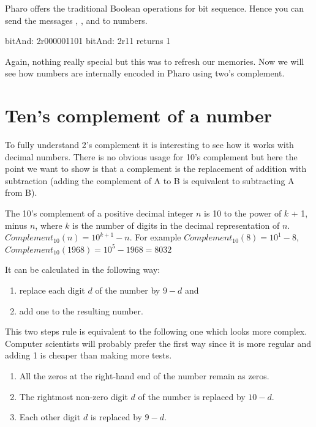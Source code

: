 \documentclass[a4paper,10pt,twoside]{book}
\begin{document}


Pharo offers the traditional Boolean operations for bit sequence. Hence you can send the messages , , and  to numbers. 

\begin{code}{bitAnd:}
2r000001101 bitAnd: 2r11
	returns 1 
\end{code}

Again, nothing really special but this was to refresh our memories. Now we will see how numbers are internally encoded in Pharo using two's complement. 

\section{Ten's complement of a number}

To fully understand 2's complement it is interesting to see how it works with decimal numbers. There is no obvious usage for 10's complement but here the point we want to show is that a complement is the replacement of addition with subtraction (\ie adding the complement of A to B is equivalent to subtracting A from B).


The 10's complement of a positive decimal integer $n$ is 10 to the power of $k$ + 1, minus $n$, where $k$ is the number of digits in the decimal representation of $n$. $Complement_{10}(n) = 10^{k+1} - n$.
For example $Complement_{10}(8)= 10^1-8$, $Complement_{10}(1968)=10^{5}-1968=8032$



It can be calculated in the following way: 
\begin{enumerate}
\item replace each digit $d$ of the number by $9-d$ and  
\item add one to the resulting number.
\end{enumerate}

This two steps rule is equivalent to the following one which looks more complex. Computer scientists will probably prefer the first way since it is more regular and adding 1 is cheaper than making more tests.

\begin{enumerate}
\item All the zeros at the right-hand end of the number remain as zeros. 
\item The rightmost non-zero digit $d$ of the number is replaced by $10 - d$. 
\item Each other digit $d$ is replaced by $9 - d$. 
\end{enumerate}
\end{document}
